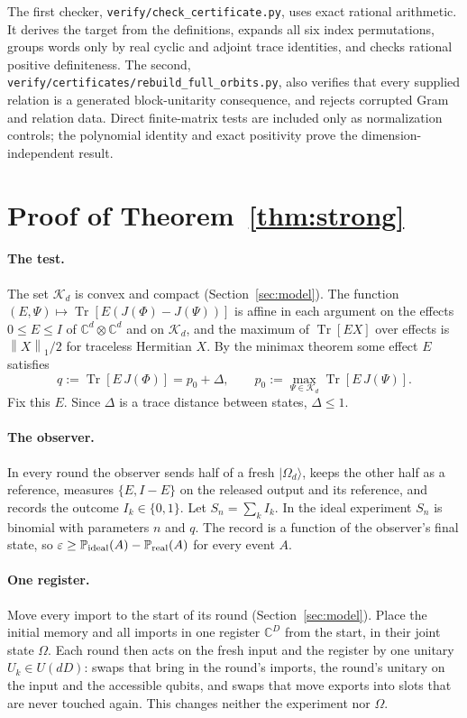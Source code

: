 \documentclass[11pt]{article}
\theoremstyle{definition}
\theoremstyle{remark}
\DeclareMathOperator{\Tr}{Tr}
\newcommand{\K}{\mathcal K}
\newcommand{\C}{\mathbb C}
\newcommand{\Prob}{\mathbb P}
\newcommand{\norm}[1]{\left\lVert#1\right\rVert}
\newcommand{\ket}[1]{\lvert#1\rangle}
\newcommand{\eps}{\varepsilon}
\begin{document}
The first checker, \texttt{verify/check\_certificate.py}, uses exact rational arithmetic. It derives the target from the definitions, expands all six index permutations, groups words only by real cyclic and adjoint trace identities, and checks rational positive definiteness. The second, \texttt{verify/certificates/rebuild\_full\_orbits.py}, also verifies that every supplied relation is a generated block-unitarity consequence, and rejects corrupted Gram and relation data. Direct finite-matrix tests are included only as normalization controls; the polynomial identity and exact positivity prove the dimension-independent result.


\section{Proof of Theorem~\ref{thm:strong}}\label{app:strong}

\paragraph{The test.}
The set $\K_d$ is convex and compact (Section~\ref{sec:model}). The function $(E,\Psi)\mapsto\Tr[E(J(\Phi)-J(\Psi))]$ is affine in each argument on the effects $0\le E\le I$ of $\C^d\otimes\C^d$ and on $\K_d$, and the maximum of $\Tr[EX]$ over effects is $\norm X_1/2$ for traceless Hermitian $X$. By the minimax theorem some effect $E$ satisfies
\[
 q:=\Tr[E\,J(\Phi)]=p_0+\Delta,\qquad p_0:=\max_{\Psi\in\K_d}\Tr[E\,J(\Psi)].
\]
Fix this $E$. Since $\Delta$ is a trace distance between states, $\Delta\le1$.

\paragraph{The observer.}
In every round the observer sends half of a fresh $\ket{\Omega_d}$, keeps the other half as a reference, measures $\{E,I-E\}$ on the released output and its reference, and records the outcome $I_k\in\{0,1\}$. Let $S_n=\sum_kI_k$. In the ideal experiment $S_n$ is binomial with parameters $n$ and $q$. The record is a function of the observer's final state, so $\eps\ge\Prob_{\rm ideal}(A)-\Prob_{\rm real}(A)$ for every event $A$.

\paragraph{One register.}
Move every import to the start of its round (Section~\ref{sec:model}). Place the initial memory and all imports in one register $\C^D$ from the start, in their joint state $\Omega$. Each round then acts on the fresh input and the register by one unitary $U_k\in U(dD)$: swaps that bring in the round's imports, the round's unitary on the input and the accessible qubits, and swaps that move exports into slots that are never touched again. This changes neither the experiment nor $\Omega$.
\end{document}

